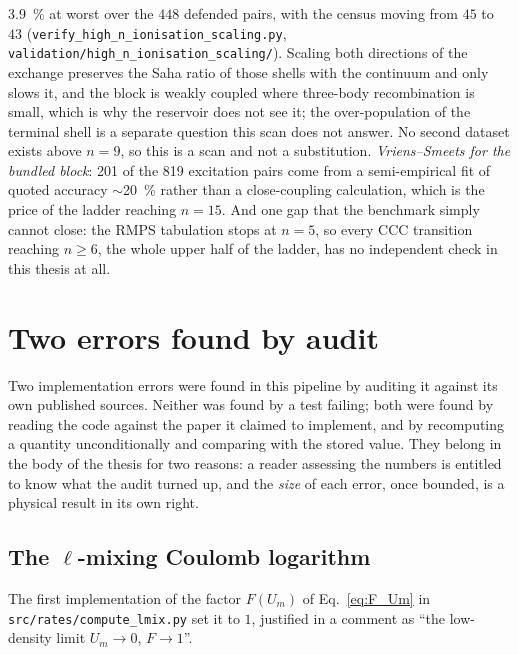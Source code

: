 \SI{3.9}{\percent} at worst over the $448$ defended pairs, with the census
moving from $45$ to $43$
(\texttt{verify\_high\_n\_ionisation\_scaling.py},
\texttt{validation/high\_n\_ionisation\_scaling/}). Scaling both directions
of the exchange preserves the Saha ratio of those shells with the continuum
and only slows it, and the block is weakly coupled where three-body
recombination is small, which is why the reservoir does not see it; the
over-population of the terminal shell is a separate question this scan does
not answer. No second dataset exists above $n=9$, so this is a scan and not a
substitution.
\emph{Vriens--Smeets for the bundled block}: 201 of the 819 excitation pairs
come from a semi-empirical fit of quoted accuracy $\sim$\SI{20}{\percent} rather
than a close-coupling calculation, which is the price of the ladder reaching
$n=15$. And one gap that the benchmark simply cannot close: the RMPS tabulation
stops at $n=5$, so every CCC transition reaching $n \ge 6$, the whole upper
half of the ladder, has no independent check in this thesis at all.

\section{Two errors found by audit}
\label{sec:atoms_corrections}

Two implementation errors were found in this pipeline by auditing it against its
own published sources. Neither was found by a test failing; both were found by
reading the code against the paper it claimed to implement, and by recomputing a
quantity unconditionally and comparing with the stored value. They belong in the
body of the thesis for two reasons: a reader assessing the numbers is entitled
to know what the audit turned up, and the \emph{size} of each error, once
bounded, is a physical result in its own right.

\subsection{The \texorpdfstring{$\ell$}{l}-mixing Coulomb logarithm}

The first implementation of the factor $F(U_m)$ of Eq.~\eqref{eq:F_Um} in
\texttt{src/rates/compute\_lmix.py} set it to $1$, justified in a comment as ``the low-density limit
$U_m \to 0$, $F \to 1$''.

